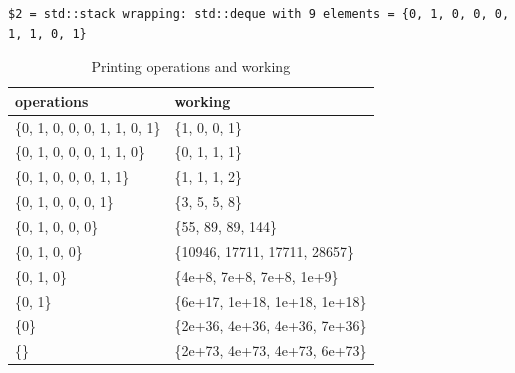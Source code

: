 \documentclass{article}
\begin{document}
\begin{verbatim}
$2 = std::stack wrapping: std::deque with 9 elements = {0, 1, 0, 0, 0, 1, 1, 0, 1}
\end{verbatim}
\vspace{1.3em}
\begin{table}[!htb]
\begin{center}
\begin{tabularx}{0.8\textwidth} { 
  >{\raggedright\arraybackslash}X 
  | >{\centering\arraybackslash}X}
  \hline
 \textbf{operations} & \textbf{working} \\
 \hline
 \{0, 1, 0, 0, 0, 1, 1, 0, 1\} & \{1, 0, 0, 1\} \\
 \hline
 \{0, 1, 0, 0, 0, 1, 1, 0\} & \{0, 1, 1, 1\} \\
 \hline
 \{0, 1, 0, 0, 0, 1, 1\} & \{1, 1, 1, 2\} \\
 \hline
 \{0, 1, 0, 0, 0, 1\} & \{3, 5, 5, 8\} \\
 \hline
 \{0, 1, 0, 0, 0\} & \{55, 89, 89, 144\} \\
 \hline
 \{0, 1, 0, 0\} & \{10946, 17711, 17711, 28657\} \\
 \hline
 \{0, 1, 0\} & \{4e+8, 7e+8, 7e+8, 1e+9\} \\
 \hline
 \{0, 1\} & \{6e+17, 1e+18, 1e+18, 1e+18\} \\
 \hline
 \{0\} & \{2e+36, 4e+36, 4e+36, 7e+36\} \\
 \hline
 \{\} & \{2e+73, 4e+73, 4e+73, 6e+73\} \\
\hline
\end{tabularx}
\caption{Printing operations and working}
\end{center}
\end{table}



\end{document}
